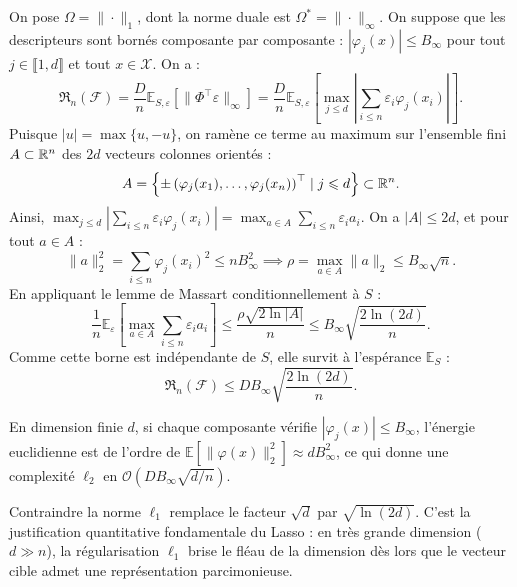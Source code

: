 \begin{proposition}
    On pose $\Omega = \|\cdot\|_1$, dont la norme duale est $\Omega^* = \|\cdot\|_\infty$. On suppose que les descripteurs sont bornés composante par composante : $|\varphi_j(x)| \leqslant B_\infty$ pour tout $j \in \llbracket 1, d \rrbracket$ et tout $x \in \mathcal{X}$. On a :
    \begin{equation}
        \mathfrak{R}_n(\mathcal{F}) = \frac{D}{n} \mathbb{E}_{S, \varepsilon} \left[ \|\Phi^\top \varepsilon\|_\infty \right] = \frac{D}{n} \mathbb{E}_{S, \varepsilon} \left[ \max_{j \leqslant d} \left| \sum_{i \leqslant n} \varepsilon_i \varphi_j(x_i) \right| \right].
    \end{equation}
    Puisque $|u| = \max\{u, -u\}$, on ramène ce terme au maximum sur l'ensemble fini $A \subset \mathbb{R}^n$ des $2d$ vecteurs colonnes orientés :
    \begin{equation}
        A = \left\{ \pm \left( \varphi_j(x_1), \dots, \varphi_j(x_n) \right)^\top \mid j \leqslant d \right\} \subset \mathbb{R}^n.
    \end{equation}
    Ainsi, $\max_{j \leqslant d} |\sum_{i \leqslant n} \varepsilon_i \varphi_j(x_i)| = \max_{a \in A} \sum_{i \leqslant n} \varepsilon_i a_i$. On a $|A| \leqslant 2d$, et pour tout $a \in A$ :
    \begin{equation}
        \|a\|_2^2 = \sum_{i \leqslant n} \varphi_j(x_i)^2 \leqslant n B_\infty^2 \implies \rho = \max_{a \in A} \|a\|_2 \leqslant B_\infty \sqrt{n}.
    \end{equation}
    En appliquant le lemme de Massart conditionnellement à $S$ :
    \begin{equation}
        \frac{1}{n} \mathbb{E}_\varepsilon \left[ \max_{a \in A} \sum_{i \leqslant n} \varepsilon_i a_i \right] \leqslant \frac{\rho \sqrt{2 \ln |A|}}{n} \leqslant B_\infty \sqrt{\frac{2 \ln(2d)}{n}}.
    \end{equation}
    Comme cette borne est indépendante de $S$, elle survit à l'espérance $\mathbb{E}_S$ :
    \begin{equation}
        \mathfrak{R}_n(\mathcal{F}) \leqslant D B_\infty \sqrt{\frac{2 \ln(2d)}{n}}.
    \end{equation}
\end{proposition}

\begin{remark}
    En dimension finie $d$, si chaque composante vérifie $|\varphi_j(x)| \leqslant B_\infty$, l'énergie euclidienne est de l'ordre de $\mathbb{E}[\|\varphi(x)\|_2^2] \approx d B_\infty^2$, ce qui donne une complexité $\ell_2$ en $\mathcal{O}\left( D B_\infty \sqrt{d/n} \right)$.
    
    Contraindre la norme $\ell_1$ remplace le facteur $\sqrt{d}$ par $\sqrt{\ln(2d)}$. C'est la justification quantitative fondamentale du Lasso : en très grande dimension ($d \gg n$), la régularisation $\ell_1$ brise le fléau de la dimension dès lors que le vecteur cible admet une représentation parcimonieuse.
\end{remark}

